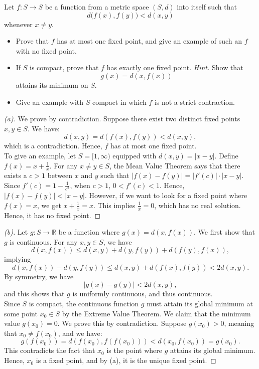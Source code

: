 \begin{problem}
    Let \(f:S\to S\) be a function from a metric space \((S,d)\) into itself such that
    \[
    d\bigl(f(x),f(y)\bigr)<d(x,y)
    \]
    whenever \(x\ne y\).
    
    \begin{itemize}
    \item[(a)] Prove that \(f\) has at most one fixed point, and give an example of such an \(f\) with no fixed point.
    \item[(b)] If \(S\) is compact, prove that \(f\) has exactly one fixed point. \emph{Hint.} Show that
    \[
    g(x)=d(x,f(x))
    \]
    attains its minimum on \(S\).
    \item[(c)] Give an example with \(S\) compact in which \(f\) is not a strict contraction.
    \end{itemize}
\end{problem}

\begin{proof}[(a)]
    We prove by contradiction. Suppose there exist two distinct fixed points $x, y \in S$. We have:
    \[
    d(x, y) = d(f(x), f(y)) < d(x, y),
    \]
    which is a contradiction. Hence, $f$ has at most one fixed point.\\
    To give an example, let $S=[1,\infty)$ equipped with $d(x,y)=|x-y|$. Define $f(x)=x+\frac{1}{x}$. For any $x \neq y \in S$, the Mean Value Theorem says that there exists a $c>1$ between $x$ and $y$ such that $|f(x)-f(y)|=|f'(c)| \cdot |x-y|$. Since $f'(c)=1-\frac{1}{c^2}$, when $c>1$, $0<f'(c)<1$. Hence, $|f(x)-f(y)|<|x-y|$. However, if we want to look for a fixed point where $f(x)=x$, we get $x+\frac{1}{x}=x$. This implies $\frac{1}{x}=0$, which has no real solution. Hence, it has no fixed point.
\end{proof}

\begin{proof}[(b)]
    Let $g: S \to \mathbb{R}$ be a function where $g(x)=d(x,f(x))$. We first show that $g$ is continuous. For any $x,y \in S$, we have
    \[
    d(x, f(x)) \le d(x, y) + d(y, f(y)) + d(f(y), f(x)),
    \]
    implying
    \[
    d(x,f(x))-d(y,f(y)) \le d(x,y)+d(f(x),f(y))<2d(x,y).
    \]
    By symmetry, we have
    \[
    |g(x)-g(y)|<2d(x,y),
    \]
    and this shows that $g$ is uniformly continuous, and thus continuous.\\
    Since $S$ is compact, the continuous function $g$ must attain its global minimum at some point $x_0 \in S$ by the Extreme Value Theorem. We claim that the minimum value $g(x_0)=0$. We prove this by contradiction. Suppose $g(x_0)>0$, meaning that $x_0 \neq f(x_0)$, and we have:
    \[
    g(f(x_0)) = d(f(x_0), f(f(x_0))) < d(x_0, f(x_0)) = g(x_0).
    \]
    This contradicts the fact that $x_0$ is the point where $g$ attains its global minimum. Hence, $x_0$ is a fixed point, and by (a), it is the unique fixed point.
\end{proof}

